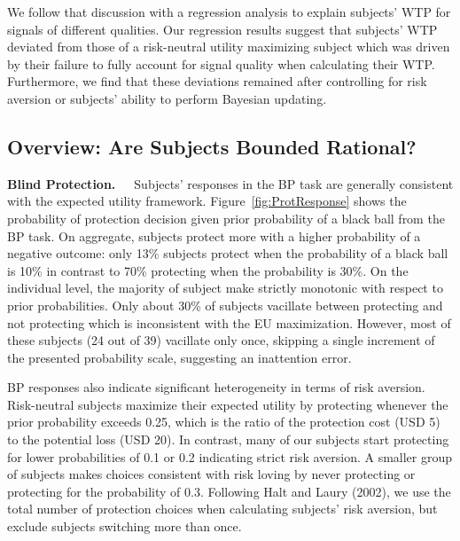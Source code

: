 \documentclass[12pt,a4paper]{article}
\begin{document}
We follow that discussion with a regression analysis to explain subjects’ WTP for signals of different qualities. Our regression results suggest that subjects’ WTP deviated from those of a risk-neutral utility maximizing subject which was driven by their failure to fully account for signal quality when calculating their WTP. Furthermore, we find that these deviations remained after controlling for risk aversion or subjects’ ability to perform Bayesian updating. 




\subsection{Overview: Are Subjects Bounded Rational?}


\textbf{Blind Protection.}\ \ \ Subjects’ responses in the BP task are generally consistent with the expected utility framework. Figure~\ref{fig:ProtResponse} shows the probability of protection decision given prior probability of a black ball from the BP task. On aggregate, subjects protect more with a higher probability of a negative outcome: only 13\% subjects protect when the probability of a black ball is 10\% in contrast to 70\% protecting when the probability is 30\%. 
On the individual level, the majority of subject make strictly monotonic with respect to prior probabilities. Only about 30\% of subjects vacillate between protecting and not protecting which is inconsistent with the EU maximization. However, most of these subjects (24 out of 39) vacillate only once, skipping a single increment of the presented probability scale, suggesting an inattention error.

BP responses also indicate significant heterogeneity in terms of risk aversion. Risk-neutral subjects maximize their expected utility by protecting whenever the prior probability exceeds 0.25, which is the ratio of the protection cost (USD 5) to the potential loss (USD 20). In contrast, many of our subjects start protecting for lower probabilities of 0.1 or 0.2 indicating strict risk aversion. A smaller group of subjects makes choices consistent with risk loving by never protecting or protecting for the probability of 0.3. Following Halt and Laury (2002), we use the total number of protection choices when calculating subjects’ risk aversion, but exclude subjects switching more than once. 
\end{document}
